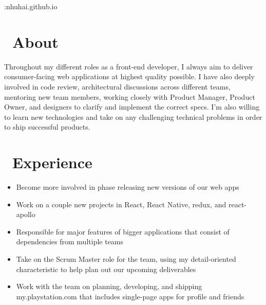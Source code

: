 \documentclass{resume}
\begin{document}


  \https:\/\/nhuhai.github.io

\section{\faInfo\ About}
Throughout my different roles as a front-end developer, I always aim to deliver consumer-facing web applications at highest quality possible. I have also deeply involved in code review, architectural discussions across different teams, mentoring new team members, working closely with Product Manager, Product Owner, and designers to clarify and implement the correct specs. I’m also willing to learn new technologies and take on any challenging technical problems in order to ship successful products.

\section{\faUsers\ Experience}
\begin{itemize}
  \item Become more involved in phase releasing new versions of our web apps
  \item Work on a couple new projects in React, React Native, redux, and react-apollo
  \item Responsible for major features of bigger applications that consist of dependencies from multiple teams
\end{itemize}

\begin{itemize}
  \item Take on the Scrum Master role for the team, using my detail-oriented characteristic to help plan out our upcoming deliverables
  \item Work with the team on planning, developing, and shipping my.playstation.com that includes single-page apps for profile and friends
\end{itemize}
\end{document}
